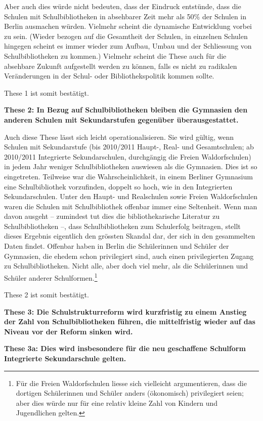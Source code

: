 \documentclass[a4paper,
fontsize=11pt,
oneside,
numbers=noperiodatend,
parskip=half-,
bibliography=totoc,
final
]{scrartcl}
\begin{document}
Aber auch dies würde nicht bedeuten, dass der Eindruck entstünde, dass
die Schulen mit Schulbibliotheken in absehbarer Zeit mehr als 50\% der
Schulen in Berlin ausmachen würden. Vielmehr scheint die dynamische
Entwicklung vorbei zu sein. (Wieder bezogen auf die Gesamtheit der
Schulen, in einzelnen Schulen hingegen scheint es immer wieder zum
Aufbau, Umbau und der Schliessung von Schulbibliotheken zu kommen.)
Vielmehr scheint die These auch für die absehbare Zukunft aufgestellt
werden zu können, falls es nicht zu radikalen Veränderungen in der
Schul- oder Bibliothekspolitik kommen sollte.

These 1 ist somit bestätigt.

\textbf{These 2: In Bezug auf Schulbibliotheken bleiben die Gymnasien den
anderen Schulen mit Sekundarstufen gegenüber überausgestattet.}

Auch diese These lässt sich leicht operationalisieren. Sie wird gültig,
wenn Schulen mit Sekundarstufe (bis 2010/2011 Haupt-, Real- und
Gesamtschulen; ab 2010/2011 Integrierte Sekundarschulen, durchgängig die
Freien Waldorfschulen) in jedem Jahr weniger Schulbibliotheken auswiesen
als die Gymnasien. Dies ist so eingetreten. Teilweise war die
Wahrscheinlichkeit, in einem Berliner Gymnasium eine Schulbibliothek
vorzufinden, doppelt so hoch, wie in den Integrierten Sekundarschulen.
Unter den Haupt- und Realschulen sowie Freien Waldorfschulen waren die
Schulen mit Schulbibliothek offenbar immer eine Seltenheit. Wenn man
davon ausgeht -- zumindest tut dies die bibliothekarische Literatur zu
Schulbibliotheken --, dass Schulbibliotheken zum Schulerfolg beitragen,
stellt dieses Ergebnis eigentlich den grössten Skandal dar, der sich in
den gesammelten Daten findet. Offenbar haben in Berlin die Schülerinnen
und Schüler der Gymnasien, die ehedem schon privilegiert sind, auch
einen privilegierten Zugang zu Schulbibliotheken. Nicht alle, aber doch
viel mehr, als die Schülerinnen und Schüler anderer
Schulformen.\footnote{Für die Freien Waldorfschulen liesse sich
  vielleicht argumentieren, dass die dortigen Schülerinnen und Schüler
  anders (ökonomisch) privilegiert seien; aber dies würde nur für eine
  relativ kleine Zahl von Kindern und Jugendlichen gelten.}

These 2 ist somit bestätigt.

\textbf{These 3: Die Schulstrukturreform wird kurzfristig zu einem Anstieg der
Zahl von Schulbibliotheken führen, die mittelfristig wieder auf das
Niveau vor der Reform sinken wird.}

\textbf{These 3a: Dies wird insbesondere für die neu geschaffene Schulform
Integrierte Sekundarschule gelten.}
\end{document}

